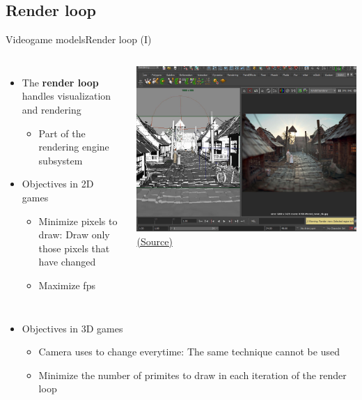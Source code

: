 \documentclass[10pt,compress]{beamer} %
\begin{document}
\subsection{Render loop}
\begin{frame}{Videogame models}{Render loop (I)}
    \begin{columns}
		\begin{itemize}
	   	\item The \textbf{render loop} handles visualization and rendering
		    \begin{itemize}
		    \item Part of the rendering engine subsystem
		    \end{itemize}
	   	\item Objectives in 2D games
		\begin{itemize}
			\item Minimize pixels to draw: Draw only those pixels that have changed
			\item Maximize fps
		\end{itemize}
		\end{itemize}
	\centering\includegraphics[width=\linewidth]{figs/rendering}\\
	\href{http://i0n1c50ft.blogspot.com/2014/07/solid-angle-for-maya-to-arnold-renderer.html}{\tiny{(Source)}}
 	\end{columns}
	\begin{itemize}
	\item Objectives in 3D games
		\begin{itemize}
			\item Camera uses to change everytime: The same technique cannot be used
			\item Minimize the number of primites to draw in each iteration of the render loop
		\end{itemize}
	\end{itemize}
\end{frame}
\end{document}
